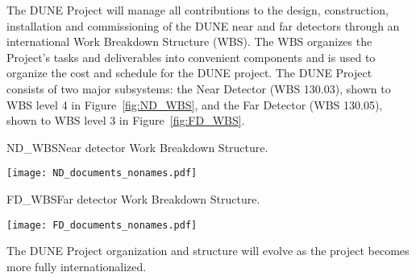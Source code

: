 The DUNE Project will manage all contributions to the design,
construction, installation and commissioning of the DUNE near and far
detectors through an international Work Breakdown Structure (WBS).
The WBS organizes the Project's tasks and deliverables into convenient
components and is used to organize the cost and schedule for the DUNE
project. The DUNE Project consists of two major subsystems: the Near Detector
(WBS 130.03), shown to WBS level 4 in Figure~\ref{fig:ND_WBS}, and the
Far Detector (WBS 130.05), shown to WBS level 3 in
Figure~\ref{fig:FD_WBS}.
\begin{cdrfigure}{ND_WBS}{Near detector Work Breakdown Structure.}
\centering
\begin{center}
\texttt{[image: ND\_documents\_nonames.pdf]}
\end{center}
\end{cdrfigure}
\begin{cdrfigure}{FD_WBS}{Far detector Work Breakdown Structure.}
\centering
\begin{center}
\texttt{[image: FD\_documents\_nonames.pdf]}
\end{center}
\end{cdrfigure}
The DUNE Project organization and structure will evolve as the project
becomes more fully internationalized.
